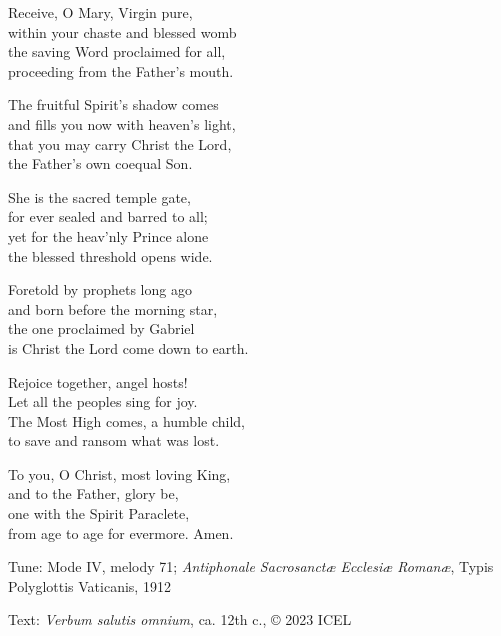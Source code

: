 \hymn

\settowidth{\versewidth}{and fills you now with heaven’s light,}

\begin{hymnverse}[\versewidth]
Receive, O Mary, Virgin pure,\\
within your chaste and blessed womb\\
the saving Word proclaimed for all,\\
proceeding from the Father’s mouth.

The fruitful Spirit’s shadow comes\\
and fills you now with heaven’s light,\\
that you may carry Christ the Lord,\\
the Father’s own coequal Son.

She is the sacred temple gate,\\
for ever sealed and barred to all;\\
yet for the heav’nly Prince alone\\
the blessed threshold opens wide.

Foretold by prophets long ago\\
and born before the morning star,\\
the one proclaimed by Gabriel\\
is Christ the Lord come down to earth.

Rejoice together, angel hosts!\\
Let all the peoples sing for joy.\\
The Most High comes, a humble child,\\
to save and ransom what was lost.

To you, O Christ, most loving King,\\
and to the Father, glory be,\\
one with the Spirit Paraclete,\\
from age to age for evermore. Amen.
\end{hymnverse}

\begin{hymnsource}
Tune: Mode IV, melody 71; \emph{Antiphonale Sacrosanctæ Ecclesiæ Romanæ}, Typis Polyglottis Vaticanis, 1912

Text: \emph{Verbum salutis omnium}, ca. 12th c., © 2023 ICEL

\end{hymnsource}